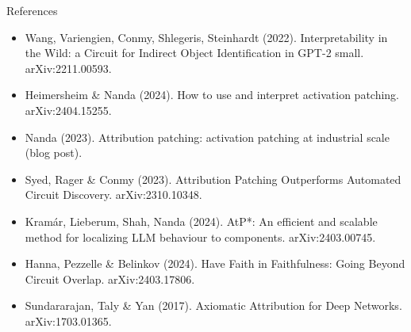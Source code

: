 \documentclass[aspectratio=169,10pt]{beamer}
\begin{document}
\begin{frame}{References}
\footnotesize
\begin{itemize}
\item Wang, Variengien, Conmy, Shlegeris, Steinhardt (2022). Interpretability in the Wild: a Circuit for Indirect Object Identification in GPT-2 small. arXiv:2211.00593.
\item Heimersheim \& Nanda (2024). How to use and interpret activation patching. arXiv:2404.15255.
\item Nanda (2023). Attribution patching: activation patching at industrial scale (blog post).
\item Syed, Rager \& Conmy (2023). Attribution Patching Outperforms Automated Circuit Discovery. arXiv:2310.10348.
\item Kramár, Lieberum, Shah, Nanda (2024). AtP*: An efficient and scalable method for localizing LLM behaviour to components. arXiv:2403.00745.
\item Hanna, Pezzelle \& Belinkov (2024). Have Faith in Faithfulness: Going Beyond Circuit Overlap. arXiv:2403.17806.
\item Sundararajan, Taly \& Yan (2017). Axiomatic Attribution for Deep Networks. arXiv:1703.01365.
\end{itemize}
\end{frame}
\end{document}
